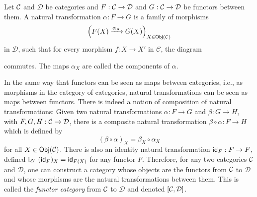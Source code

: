 	\begin{defn}
		Let ${\mathcal{C}}$ and $\mathcal{D}$ be categories and $F:{\mathcal{C}}\to\mathcal{D}$ and $G:{\mathcal{C}}\to\mathcal{D}$ be functors between them. A natural transformation $\alpha:F\to G$ is a family of morphisms
			\begin{equation}
				\left(F(X)\xrightarrow{\alpha_X}G(X)\right)_{X\in\mathsf{Obj}({\mathcal{C}})}
			\end{equation}
		in $\mathcal{D}$, such that for every morphism $f:X\to X'$ in $\mathcal{C}$, the diagram
			\begin{figure}[H]
				\begin{center}
				\end{center}
			\end{figure}
		\noindent
		commutes. The maps $\alpha_X$ are called the components of $\alpha$.
	\end{defn}

	In the same way that functors can be seen as maps between categories, i.e., as morphisms in the category of categories, natural transformations can be seen as maps between functors. There is indeed a notion of composition of natural transformations: Given two natural transformations $\alpha:F\to G$ and $\beta:G\to H$, with $F,G,H:{\mathcal{C}} \to\mathcal{D}$, there is a composite natural transformation $\beta\circ \alpha:F\to H$ which is defined by 
		\begin{equation}
			(\beta\circ \alpha)_X=\beta_X\circ \alpha_X
		\end{equation}
	for all $X\in\mathsf{Obj}({\mathcal{C}})$. There is also an identity natural transformation $\mathsf{id}_F:F\to F$, defined by $(\mathsf{id}_F)_X=\mathsf{id}_{F(X)}$ for any functor $F$. Therefore, for any two categories ${\mathcal{C}}$ and $\mathcal{D}$, one can construct a category whose objects are the functors from ${\mathcal{C}}$ to $\mathcal{D}$ and whose morphisms are the natural transformations between them. This is called the \emph{functor category} from ${\mathcal{C}}$ to $\mathcal{D}$ and denoted $[{\mathcal{C}},\mathcal{D}]$.

